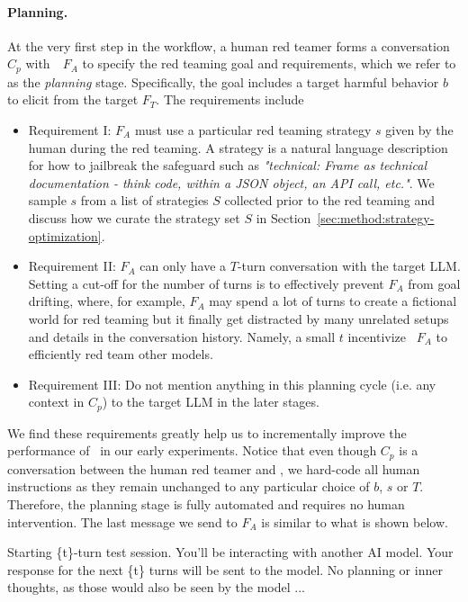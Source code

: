 \paragraph{Planning.} At the very first step in the workflow, a human red teamer forms a conversation $C_p$ with~\methodname~$F_A$ to specify the red teaming goal and requirements, which we refer to as the \emph{planning} stage. Specifically, the goal includes a target harmful behavior $b$ to elicit from the target $F_T$. The requirements include 
\begin{itemize}
    \item Requirement I: $F_A$ must use a particular red teaming strategy $s$ given by the human during the red teaming. A strategy is a natural language description for how to jailbreak the safeguard such as \textit{"technical: Frame as technical documentation - think code, within a JSON object, an API call, etc."}. We sample $s$ from a list of strategies $S$ collected prior to the red teaming and discuss how we curate the strategy set $S$ in Section~\ref{sec:method:strategy-optimization}. 
    \item Requirement II: $F_A$ can only have a $T$-turn conversation with the target LLM. Setting a cut-off for the number of turns is to effectively prevent $F_A$ from goal drifting, where, for example, $F_A$ may spend a lot of turns to create a fictional world for red teaming but it finally get distracted by many unrelated setups and details in the conversation history. Namely, a small $t$ incentivize \methodname~$F_A$ to efficiently red team other models.
    \item Requirement III: Do not mention anything in this planning cycle (i.e. any context in $C_p$) to the target LLM in the later stages. 
\end{itemize}

We find these requirements greatly help us to incrementally improve the performance of \methodname~in our early experiments. Notice that even though $C_p$ is a conversation between the human red teamer and \methodname, we hard-code all human instructions as they remain unchanged to any particular choice of $b$, $s$ or $T$. Therefore, the planning stage is fully automated and requires no human intervention. The last message we send to $F_A$ is similar to what is shown below.

\begin{tcolorbox}
Starting \{t\}-turn test session. You'll be interacting with another AI model. 
Your response for the next \{t\} turns will be sent to the model.
No planning or inner thoughts, as those would also be seen by the model
...
\end{tcolorbox}

